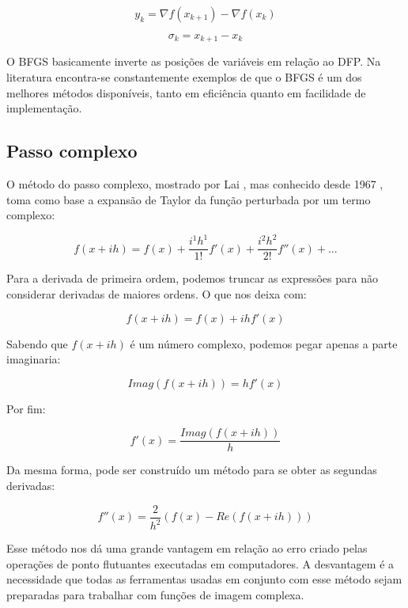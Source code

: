 \begin{equation}
y_k = \nabla f(x_{k+1}) - \nabla f(x_k)
\end{equation}

\begin{equation}
\sigma_k = x_{k+1} - x_k
\end{equation}

O BFGS basicamente inverte as posições de variáveis em relação ao DFP.
Na literatura encontra-se constantemente exemplos de que o BFGS é um dos melhores
métodos disponíveis, tanto em eficiência quanto em facilidade de implementação.

\subsection{Passo complexo}

\noindent
O método do passo complexo, mostrado por Lai \cite{Lai_2005}, mas
conhecido desde 1967 \cite{Lyness_1967}, toma como base a expansão de Taylor da função
perturbada por um termo complexo:

\begin{equation}
f(x + ih) = f(x) + \frac{i^1h^1}{1!}f'(x) + \frac{i^2h^2}{2!} f''(x) + ...
\end{equation}

Para a derivada de primeira ordem, podemos truncar as expressões para não considerar derivadas
de maiores ordens. O que nos deixa com:


\begin{equation}
f(x + ih) = f(x) + ihf'(x)
\end{equation}

Sabendo que \(f(x+ih)\) é um número complexo, podemos pegar apenas a parte imaginaria:

\begin{equation}
Imag(f(x + ih)) = hf'(x)
\end{equation}

Por fim:

\begin{equation}
f'(x) = \frac{Imag(f(x + ih))}{h}
\end{equation}

Da mesma forma, pode ser construído um método para se obter as segundas derivadas:

\begin{equation}
f''(x) = \frac{2}{h^2} (f(x) - Re(f(x+ih)))
\end{equation}

Esse método nos dá uma grande vantagem em relação ao erro criado pelas operações de ponto flutuantes
executadas em computadores. A desvantagem é a necessidade que todas as ferramentas usadas em
conjunto com esse método sejam preparadas para trabalhar com funções de imagem complexa.

